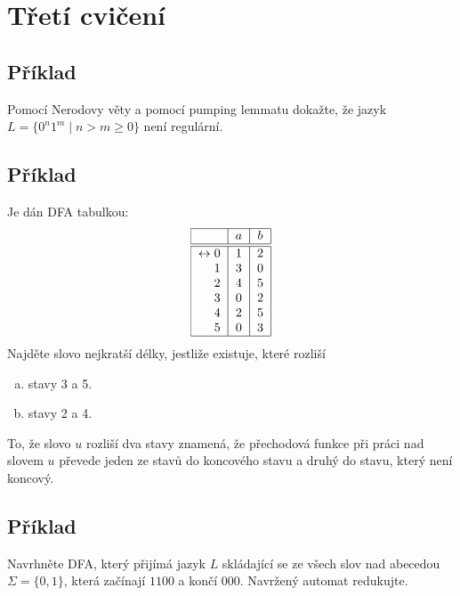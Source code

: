 \section{Třetí cvičení}

\subsection{Příklad}
Pomocí Nerodovy věty a pomocí pumping lemmatu dokažte, že jazyk $L = \{0^n 1^m \mid n > m \geq 0\}$ není regulární.

\subsection{Příklad}
Je dán DFA tabulkou:
\[
\begin{tabular}{|r|c|c|}
    \hline
    & $a$ & $b$\\
    \hline
    \hline
    $\leftrightarrow 0$& $1$ & $2$\\
    $1$                & $3$ & $0$\\
    $2$                & $4$ & $5$\\
    $3$                & $0$ & $2$\\
    $4$                & $2$ & $5$\\
    $5$                & $0$ & $3$\\
    \hline
\end{tabular}
\]
Najděte slovo nejkratší délky, jestliže existuje, které rozliší
\begin{enumerate}[a), noitemsep]
    \item stavy 3 a 5.
    \item stavy 2 a 4.
\end{enumerate}
To, že slovo $u$ rozliší dva stavy znamená, že přechodová funkce při práci nad slovem $u$ převede jeden ze stavů do koncového stavu a druhý do stavu, který není koncový.

\subsection{Příklad}
Navrhněte DFA, který přijímá jazyk $L$ skládající se ze všech slov nad abecedou $\Sigma = \{0, 1\}$, která začínají $1100$ a končí $000$. Navržený automat redukujte.

